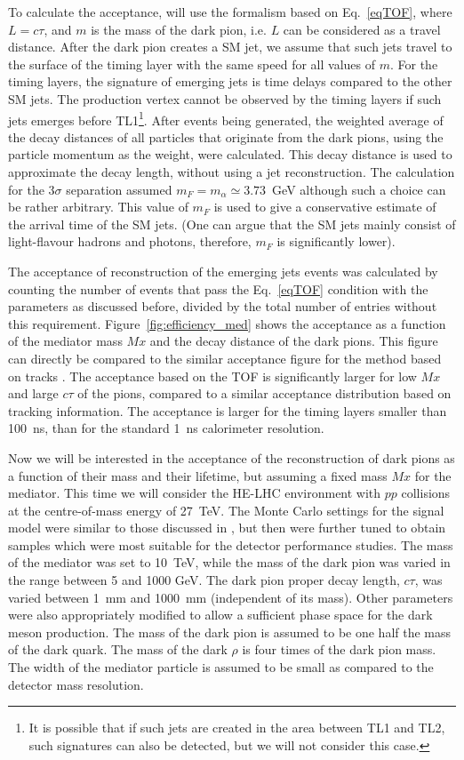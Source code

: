 To calculate the acceptance, will use the formalism based on Eq.~\ref{eqTOF}, where $L=c\tau$, and $m$ is the mass
of the dark pion, i.e. $L$ can be considered as a travel distance. After the dark pion creates a SM jet, we assume that
such jets travel to the surface of the timing layer with the same speed for all values of $m$.
For the timing layers, the signature of emerging jets is time delays compared to the other SM jets. The  production vertex
cannot be observed by the timing layers if such jets emerges before TL1\footnote{It is possible that if such jets are created in the area between TL1 and TL2,
such signatures can also be detected, but we will not consider this case.}. 
After events being generated, the weighted average of the decay distances of all particles that originate from
the dark pions, using the particle momentum as the weight, were  calculated. This decay distance is used
to approximate the decay length, without using a jet reconstruction.  
The  calculation for the $3\sigma$ separation assumed $m_F=m_{\alpha}\simeq 3.73$~GeV although such a choice can be rather arbitrary.
This value of $m_F$ is used to give a conservative estimate of the arrival time of the SM jets.
(One can argue that the SM jets mainly consist of light-flavour hadrons and photons, therefore, $m_F$ is significantly lower).

The acceptance of reconstruction of the emerging jets events was calculated by counting the number of events that pass the 
Eq.~\ref{eqTOF} condition  with the parameters as discussed before, divided by the total number of entries
without this requirement. Figure~\ref{fig:efficiency_med} shows the acceptance as a function of the mediator mass $Mx$ and the decay distance
of the dark pions. This figure can directly be compared to the similar acceptance figure for the method based on tracks  \cite{Sirunyan:2018njd}. 
The acceptance based on the TOF is significantly larger for low $Mx$ and large $c\tau$ of the pions, compared to a
similar acceptance distribution based on tracking information.  
The acceptance is larger for the timing layers smaller than 100~ns, than for the standard 1~ns calorimeter resolution. 

Now we will be interested in the acceptance  of the reconstruction of dark pions  as a function of their mass
and their lifetime, but assuming a fixed mass $Mx$ for the mediator. This time we will consider the HE-LHC environment with $pp$ collisions at the centre-of-mass energy of 27~TeV.    
 The Monte Carlo settings for the signal model were similar
to those discussed in  \cite{Sirunyan:2018njd}, but then were further tuned \cite{prive} to obtain samples  which were most suitable
for the detector performance studies. 
The mass of the mediator was set to 10~TeV, while the mass of the dark pion was varied in the range between 5 and 1000 GeV.
The dark pion proper decay length, $c\tau$,  was varied between 1~mm and 1000~mm (independent of its mass). Other parameters
were also appropriately modified to allow a sufficient phase space for the dark meson production.
The mass of the dark pion is assumed to be one half the mass of the dark quark. The mass of the dark
$\rho$ is four times of the dark pion mass. The width of the
mediator particle is assumed to be small as compared to the detector mass resolution.


